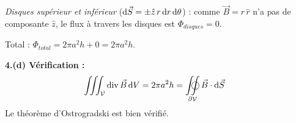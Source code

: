 \documentclass[12pt,a4paper]{article}
\begin{document}
\begin{boitecorrige}
\textit{Disques supérieur et inférieur} ($\mathrm{d}\vec{S} = \pm\hat{z}\,r\,\mathrm{d} r\,\mathrm{d}\theta$) : comme $\vec{B} = r\,\hat{r}$ n'a pas de composante $\hat{z}$, le flux à travers les disques est $\Phi_{disques} = 0$.

Total : $\Phi_{total} = 2\pi a^2 h + 0 = 2\pi a^2 h$.

\textbf{4.(d) Vérification :}
\[
\iiint_\mathcal{V} \text{div}\,\vec{B}\,\d V = 2\pi a^2 h = \oiint_{\partial\mathcal{V}} \vec{B}\cdot\d\vec{S} \quad
\]
Le théorème d'Ostrogradski est bien vérifié.
\end{boitecorrige}

\ifdefined\inMainDoc\else
\end{document}
